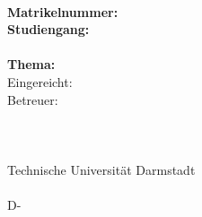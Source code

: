 \renewcommand{\baselinestretch}{1}
\normalsize

\begin{tabular}{c}\end{tabular}
\vfill
\textbf{\TUAutor}\\
\textbf{Matrikelnummer: \TUMatrikelnr}\\
\textbf{Studiengang: \TUStudiengang}\\

\textbf{\TUTyp}\\
\textbf{Thema: \TUTitel}\\

Eingereicht: \TUAbgabe\\

Betreuer: \TUBetreuer\\

\TUProf\\
\TUFachgebiet\\
\TUFachbereich\\
Technische Universität Darmstadt\\
\TUAdresse\\
D-\TUPostleitzahl~\TUStadt\\

\renewcommand{\baselinestretch}{1.25}
\normalsize
